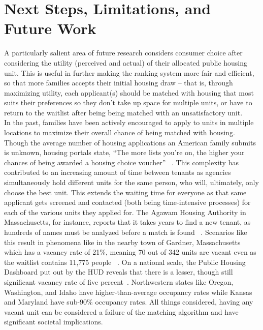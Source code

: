 \documentclass[11pt]{article}
\begin{document}
\section{Next Steps, Limitations, and Future Work}
A particularly salient area of future research considers consumer choice after considering the utility (perceived and actual) of their allocated public housing unit. This is useful in further making the ranking system more fair and efficient, so that more families accepts their initial housing draw – that is, through maximizing utility, each applicant(s) should be matched with housing that most suits their preferences so they don’t take up space for multiple units, or have to return to the waitlist after being being matched with an unsatisfactory unit. \\
\newline
In the past, families have been actively encouraged to apply to units in multiple locations to maximize their overall chance of being matched with housing. Though the average number of housing applications an American family submits is unknown, housing portals state, “The more lists you’re on, the higher your chances of being awarded a housing choice voucher” ~\cite{advisors_stuck_2023}. This complexity has contributed to an increasing amount of time between tenants as agencies simultaneously hold different units for the same person, who will, ultimately, only choose the best unit. This extends the waiting time for everyone as that same applicant gets screened and contacted (both being time-intensive processes) for each of the various units they applied for. The Agawam Housing Authority in Massachusetts, for instance, reports that it takes years to find a new tenant, as hundreds of names must be analyzed before a match is found~\cite{todd_wallack_mass_2023} . Scenarios like this result in phenomena like in the nearby town of Gardner, Massachusetts which has a vacancy rate of 21\%, meaning 70 out of 342 units are vacant even as the waitlist contains 11,775 people~\cite{todd_wallack_mass_2023} . On a national scale, the Public Housing Dashboard put out by the HUD reveals that there is a lesser, though still significant vacancy rate of five percent~\cite{hud_public_nodate}. Northwestern states like Oregon, Washington, and Idaho have higher-than-average occupancy rates while Kansas and Maryland have sub-90\% occupancy rates. All things considered, having any vacant unit can be considered a failure of the matching algorithm and have significant societal implications. \\
\newline
\end{document}
